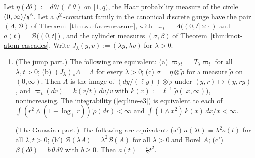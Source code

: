 \begin{proposition}
\label{prop:strata-cylinder-coordinates}
\leanok
{}
Let $\eta(d\theta) := d\theta/(\ell\theta)$ on $[1,q)$, the Haar probability measure of the circle
$(0,\infty)/q^{\mathbb{Z}}$. Let a $q^{\mathbb{Z}}$-covariant family in the canonical discrete gauge have the pair
$(\Lambda, \mathcal{B})$ of Theorem~\ref{thm:surface-measure}, with
$\varpi_t = \Lambda((0,t] \times \cdot\,)$ and $a(t) = \mathcal{B}((0,t])$, and the cylinder
measures $(\sigma, \beta)$ of Theorem~\ref{thm:knot-atom-cascades}. Write
$J_\lambda(y,v) := (\lambda y, \lambda v)$ for $\lambda > 0$.
\begin{enumerate}
\item (The jump part.) The following are equivalent: (a) $\varpi_{\lambda t} = T_\lambda\varpi_t$
for all $\lambda, t > 0$; (b) $(J_\lambda)_*\Lambda = \Lambda$ for every $\lambda > 0$;
(c) $\sigma = \eta \otimes \tilde\rho$ for a measure $\tilde\rho$ on $(0,\infty)$. Then $\Lambda$ is
the image of $(dy/(\ell y)) \otimes \tilde\rho$ under $(y,r) \mapsto (y, ry)$, and
$\varpi_t(dv) = k(v/t)\,dv/v$ with $k(x) := \ell^{-1}\tilde\rho([x,\infty))$, nonincreasing. The
integrability (\ref{eq:line-e3}) is equivalent to each of $\int(r^2 \wedge (1 + \log_+r))\,\tilde\rho(dr) < \infty$
and $\int(1 \wedge x^2)\,k(x)\,dx/x < \infty$.

(The Gaussian part.) The following are equivalent: (a$'$) $a(\lambda t) = \lambda^2a(t)$ for all
$\lambda, t > 0$; (b$'$) $\mathcal{B}(\lambda A) = \lambda^2\mathcal{B}(A)$ for all $\lambda > 0$
and Borel $A$; (c$'$) $\beta(d\theta) = b\,\theta\,d\theta$ with $b \ge 0$. Then
$a(t) = \tfrac b2t^2$.


\end{enumerate}
\end{proposition}
